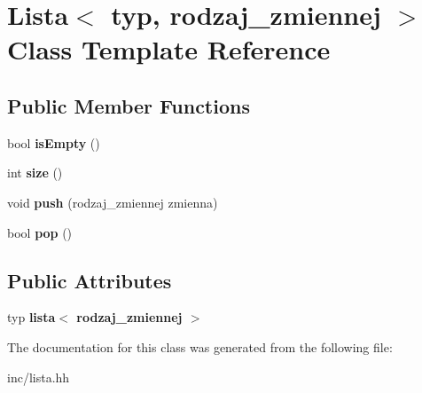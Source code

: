 \hypertarget{class_lista}{\section{Lista$<$ typ, rodzaj\-\_\-zmiennej $>$ Class Template Reference}
\label{class_lista}
}
\subsection*{Public Member Functions}
\begin{DoxyCompactItemize}
\item 
\hypertarget{class_lista_a016d91e6f4cc79fb3ab25e9580fb75e7}{bool {\bfseries is\-Empty} ()}\label{class_lista_a016d91e6f4cc79fb3ab25e9580fb75e7}

\item 
\hypertarget{class_lista_a8a97bce7e62d99ddd03f11c28f235d37}{int {\bfseries size} ()}\label{class_lista_a8a97bce7e62d99ddd03f11c28f235d37}

\item 
\hypertarget{class_lista_a2a1c6be34ca396591d3e8c81b9f656c5}{void {\bfseries push} (rodzaj\-\_\-zmiennej zmienna)}\label{class_lista_a2a1c6be34ca396591d3e8c81b9f656c5}

\item 
\hypertarget{class_lista_a4ac19f9aeac66a918e5c3be417224c56}{bool {\bfseries pop} ()}\label{class_lista_a4ac19f9aeac66a918e5c3be417224c56}

\end{DoxyCompactItemize}
\subsection*{Public Attributes}
\begin{DoxyCompactItemize}
\item 
\hypertarget{class_lista_a3a698d8ac1ee59d2c10fcde947aec45d}{typ {\bfseries lista$<$ rodzaj\-\_\-zmiennej $>$}}\label{class_lista_a3a698d8ac1ee59d2c10fcde947aec45d}

\end{DoxyCompactItemize}


The documentation for this class was generated from the following file\-:\begin{DoxyCompactItemize}
\item 
inc/lista.\-hh\end{DoxyCompactItemize}
